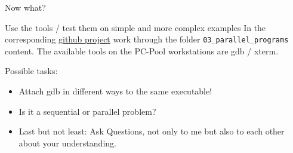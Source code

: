 \documentclass[aspectratio=1610]{beamer}
\begin{document}
	\begin{frame}[fragile]{Now what?}
		\begin{block}{Use the tools / test them on simple and more complex examples}
			In the corresponding \href{https://github.com/joscao/cpp-debugging}{github project} work through the folder \texttt{03\_parallel\_programs} content. The available tools on the PC-Pool workstations are gdb / xterm.
			
			\vspace{1cm}
			
			Possible tasks:
			\begin{itemize}
				\item Attach gdb in different ways to the same executable!
				\item Is it a sequential or parallel problem?
				\item Last but not least: Ask Questions, not only to me but also to each other about your understanding.
			\end{itemize}
		\end{block}
	\end{frame}
\end{document}
